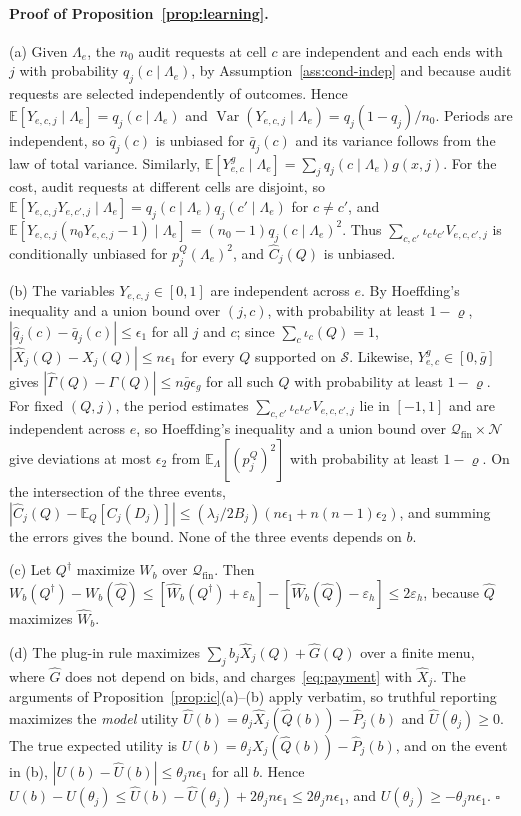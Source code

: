 \documentclass[opre,dblanonrev]{informs4}
\providecommand{\E}{\mathbb{E}}
\providecommand{\1}{\mathbf{1}}
\providecommand{\Var}{\operatorname{Var}}
\begin{document}
\begin{APPENDICES}
\paragraph{Proof of Proposition~\ref{prop:learning}.}
(a) Given $\Lambda_e$, the $n_0$ audit requests at cell $c$ are independent and each ends with $j$ with probability $q_j(c\mid\Lambda_e)$, by Assumption~\ref{ass:cond-indep} and because audit requests are selected independently of outcomes. Hence $\E[Y_{e,c,j}\mid\Lambda_e]=q_j(c\mid\Lambda_e)$ and $\Var(Y_{e,c,j}\mid\Lambda_e)=q_j(1-q_j)/n_0$. Periods are independent, so $\hat q_j(c)$ is unbiased for $\bar q_j(c)$ and its variance follows from the law of total variance. Similarly, $\E[Y^g_{e,c}\mid\Lambda_e]=\sum_jq_j(c\mid\Lambda_e)g(x,j)$. For the cost, audit requests at different cells are disjoint, so $\E[Y_{e,c,j}Y_{e,c',j}\mid\Lambda_e]=q_j(c\mid\Lambda_e)q_j(c'\mid\Lambda_e)$ for $c\ne c'$, and $\E[Y_{e,c,j}(n_0Y_{e,c,j}-1)\mid\Lambda_e]=(n_0-1)q_j(c\mid\Lambda_e)^2$. Thus $\sum_{c,c'}\iota_c\iota_{c'}V_{e,c,c',j}$ is conditionally unbiased for $p_j^Q(\Lambda_e)^2$, and $\hat C_j(Q)$ is unbiased.

(b) The variables $Y_{e,c,j}\in[0,1]$ are independent across $e$. By Hoeffding's inequality and a union bound over $(j,c)$, with probability at least $1-\varrho$, $|\hat q_j(c)-\bar q_j(c)|\le\epsilon_1$ for all $j$ and $c$; since $\sum_c\iota_c(Q)=1$, $|\hat X_j(Q)-X_j(Q)|\le n\epsilon_1$ for every $Q$ supported on $\mathcal S$. Likewise, $Y^g_{e,c}\in[0,\bar g]$ gives $|\hat\Gamma(Q)-\Gamma(Q)|\le n\bar g\epsilon_g$ for all such $Q$ with probability at least $1-\varrho$. For fixed $(Q,j)$, the period estimates $\sum_{c,c'}\iota_c\iota_{c'}V_{e,c,c',j}$ lie in $[-1,1]$ and are independent across $e$, so Hoeffding's inequality and a union bound over $\mathcal Q_{\mathrm{fin}}\times\mathcal N$ give deviations at most $\epsilon_2$ from $\E_\Lambda[(p_j^Q)^2]$ with probability at least $1-\varrho$. On the intersection of the three events, $|\hat C_j(Q)-\E_Q[C_j(D_j)]|\le(\lambda_j/2B_j)(n\epsilon_1+n(n-1)\epsilon_2)$, and summing the errors gives the bound. None of the three events depends on $b$.

(c) Let $Q^\dagger$ maximize $W_b$ over $\mathcal Q_{\mathrm{fin}}$. Then $W_b(Q^\dagger)-W_b(\hat Q)\le[\hat W_b(Q^\dagger)+\varepsilon_h]-[\hat W_b(\hat Q)-\varepsilon_h]\le2\varepsilon_h$, because $\hat Q$ maximizes $\hat W_b$.

(d) The plug-in rule maximizes $\sum_jb_j\hat X_j(Q)+\hat G(Q)$ over a finite menu, where $\hat G$ does not depend on bids, and charges~\eqref{eq:payment} with $\hat X_j$. The arguments of Proposition~\ref{prop:ic}(a)--(b) apply verbatim, so truthful reporting maximizes the \emph{model} utility $\hat U(b)=\theta_j\hat X_j(\hat Q(b))-\hat P_j(b)$ and $\hat U(\theta_j)\ge0$. The true expected utility is $U(b)=\theta_jX_j(\hat Q(b))-\hat P_j(b)$, and on the event in (b), $|U(b)-\hat U(b)|\le\theta_jn\epsilon_1$ for all $b$. Hence $U(b)-U(\theta_j)\le\hat U(b)-\hat U(\theta_j)+2\theta_jn\epsilon_1\le2\theta_jn\epsilon_1$, and $U(\theta_j)\ge-\theta_jn\epsilon_1$. \hfill$\square$


\end{APPENDICES}
\end{document}
